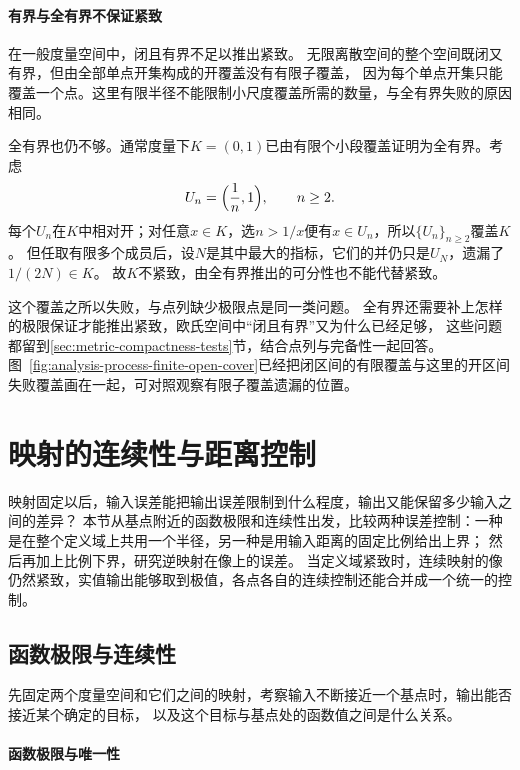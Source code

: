 \paragraph{有界与全有界不保证紧致}

在一般度量空间中，闭且有界不足以推出紧致。
无限离散空间的整个空间既闭又有界，但由全部单点开集构成的开覆盖没有有限子覆盖，
因为每个单点开集只能覆盖一个点。这里有限半径不能限制小尺度覆盖所需的数量，与全有界失败的原因相同。

全有界也仍不够。通常度量下$K=(0,1)$已由有限个小段覆盖证明为全有界。考虑
\[
  U_n=\Bigl(\frac1n,1\Bigr),\qquad n\geq2.
\]
每个$U_n$在$K$中相对开；对任意$x\in K$，选$n>1/x$便有$x\in U_n$，所以$\{U_n\}_{n\geq2}$覆盖$K$。
但任取有限多个成员后，设$N$是其中最大的指标，它们的并仍只是$U_N$，遗漏了$1/(2N)\in K$。
故$K$不紧致，由全有界推出的可分性也不能代替紧致。

这个覆盖之所以失败，与点列缺少极限点是同一类问题。
全有界还需要补上怎样的极限保证才能推出紧致，欧氏空间中“闭且有界”又为什么已经足够，
这些问题都留到\ref{sec:metric-compactness-tests}节，结合点列与完备性一起回答。
图~\ref{fig:analysis-process-finite-open-cover}已经把闭区间的有限覆盖与这里的开区间失败覆盖画在一起，可对照观察有限子覆盖遗漏的位置。

\section{映射的连续性与距离控制}
\label{sec:metric-map-error-transfer}

映射固定以后，输入误差能把输出误差限制到什么程度，输出又能保留多少输入之间的差异？
本节从基点附近的函数极限和连续性出发，比较两种误差控制：一种是在整个定义域上共用一个半径，另一种是用输入距离的固定比例给出上界；
然后再加上比例下界，研究逆映射在像上的误差。
当定义域紧致时，连续映射的像仍然紧致，实值输出能够取到极值，各点各自的连续控制还能合并成一个统一的控制。

\subsection{函数极限与连续性}
\label{sec:metric-map-limits}

先固定两个度量空间和它们之间的映射，考察输入不断接近一个基点时，输出能否接近某个确定的目标，
以及这个目标与基点处的函数值之间是什么关系。

\paragraph{函数极限与唯一性}

